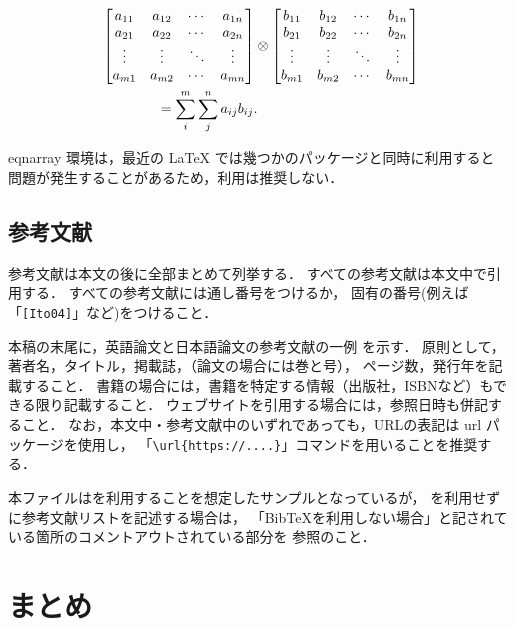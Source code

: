 \documentclass[a4paper,twocolumn,dvipdfmx,uplatex]{jsarticle} %
\begin{document}
\begin{align}
	& \begin{bmatrix}
	a_{11} & a_{12} & \cdots & a_{1n} \\
	a_{21} & a_{22} & \cdots & a_{2n} \\
	\vdots & \vdots & \ddots & \vdots \\
	a_{m1} & a_{m2} & \cdots & a_{mn} \\
	\end{bmatrix}
	\otimes
	\begin{bmatrix}
	b_{11} & b_{12} & \cdots & b_{1n} \\
	b_{21} & b_{22} & \cdots & b_{2n} \\
	\vdots & \vdots & \ddots & \vdots \\
	b_{m1} & b_{m2} & \cdots & b_{mn} \\
	\end{bmatrix} \notag \\
	& \qquad \qquad = \sum_{i}^{m}\sum_{j}^{n}a_{ij}b_{ij} .
	\label{eq:samp2}
\end{align}

eqnarray 環境は，最近の LaTeX では幾つかのパッケージと同時に利用すると
問題が発生することがあるため，利用は推奨しない．

\subsection{参考文献}
参考文献は本文の後に全部まとめて列挙する．
すべての参考文献は本文中で引用する．
すべての参考文献には通し番号をつけるか，
固有の番号(例えば「\verb+[Ito04]+」など)をつけること．

本稿の末尾に，英語論文と日本語論文の参考文献の一例 \cite{Ito04}\cite{Abe10} を示す．
原則として，著者名，タイトル，掲載誌，（論文の場合には巻と号），
ページ数，発行年を記載すること．
書籍の場合には，書籍を特定する情報（出版社，ISBNなど）もできる限り記載すること\cite{Ito18}．
ウェブサイト\cite{ArtScience}を引用する場合には，参照日時も併記すること．
なお，本文中・参考文献中のいずれであっても，URLの表記は url パッケージを使用し，
「\verb+\url{https://....}+」コマンドを用いることを推奨する．

本ファイルは\BibTeX を利用することを想定したサンプルとなっているが，
\BibTeX を利用せずに参考文献リストを記述する場合は，
「BibTeXを利用しない場合」と記されている箇所のコメントアウトされている部分を
参照のこと．

\section{まとめ}
\end{document}
